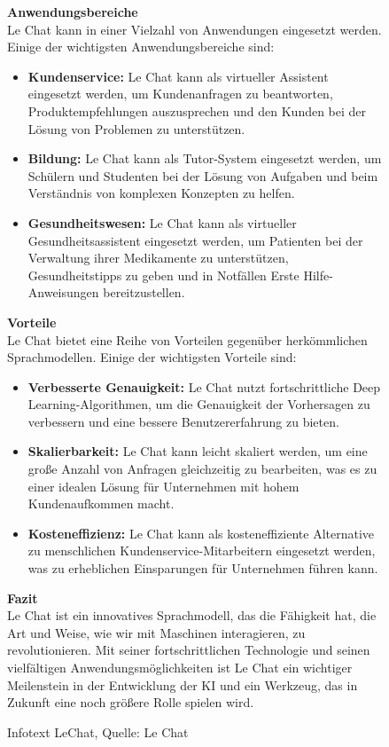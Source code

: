 \begin{figure}
\begin{tcolorbox}[colback=gray!20, colframe=gray!20, boxrule=0pt, sharp corners]
        \textbf{Anwendungsbereiche}\\
        Le Chat kann in einer Vielzahl von Anwendungen eingesetzt werden. Einige der wichtigsten Anwendungsbereiche sind:
        \begin{itemize}
            \item \textbf{Kundenservice:} Le Chat kann als virtueller Assistent eingesetzt werden, um Kundenanfragen zu 
            beantworten, Produktempfehlungen auszusprechen und den Kunden bei der Lösung von Problemen zu unterstützen.
            \item \textbf{Bildung:} Le Chat kann als Tutor-System eingesetzt werden, um Schülern und Studenten bei der 
            Lösung von Aufgaben und beim Verständnis von komplexen Konzepten zu helfen.
            \item \textbf{Gesundheitswesen:} Le Chat kann als virtueller Gesundheitsassistent eingesetzt werden, um 
            Patienten bei der Verwaltung ihrer Medikamente zu unterstützen, Gesundheitstipps zu geben und in Notfällen 
            Erste Hilfe-Anweisungen bereitzustellen.
            \end{itemize}
        \textbf{Vorteile}\\
        Le Chat bietet eine Reihe von Vorteilen gegenüber herkömmlichen Sprachmodellen. Einige der wichtigsten Vorteile sind:
        \begin{itemize}
            \item \textbf{Verbesserte Genauigkeit:} Le Chat nutzt fortschrittliche Deep Learning-Algorithmen, um die 
            Genauigkeit der Vorhersagen zu verbessern und eine bessere Benutzererfahrung zu bieten.
            \item \textbf{Skalierbarkeit:} Le Chat kann leicht skaliert werden, um eine große Anzahl von Anfragen 
            gleichzeitig zu bearbeiten, was es zu einer idealen Lösung für Unternehmen mit hohem Kundenaufkommen macht.
            \item \textbf{Kosteneffizienz:} Le Chat kann als kosteneffiziente Alternative zu menschlichen 
            Kundenservice-Mitarbeitern eingesetzt werden, was zu erheblichen Einsparungen für Unternehmen führen kann.
            \end{itemize}
        \textbf{Fazit}\\
        Le Chat ist ein innovatives Sprachmodell, das die Fähigkeit hat, die Art und Weise, wie wir mit Maschinen 
        interagieren, zu revolutionieren. Mit seiner fortschrittlichen Technologie und seinen vielfältigen 
        Anwendungsmöglichkeiten ist Le Chat ein wichtiger Meilenstein in der Entwicklung der KI und ein Werkzeug, 
        das in Zukunft eine noch größere Rolle spielen wird.
        \vfill
    \end{tcolorbox}
    \caption{Infotext LeChat, Quelle: Le Chat}
    \label{InfotextLeChat}
\end{figure}

